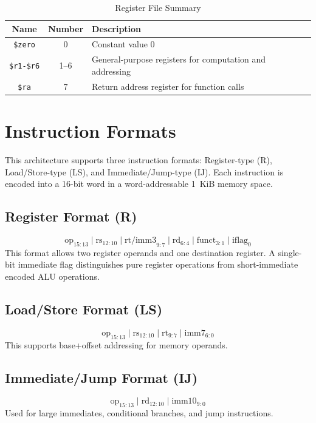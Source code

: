 \documentclass[12pt]{report}
\begin{document}
\begin{table}[h!]
\centering
\begin{tabular}{|c|c|l|}
\hline
\textbf{Name} & \textbf{Number} & \textbf{Description} \\ \hline
\texttt{\$zero} & 0 & Constant value 0 \\ \hline
\texttt{\$r1-\$r6} & 1--6 & General-purpose registers for computation and addressing \\ \hline
\texttt{\$ra} & 7 & Return address register for function calls \\ \hline
\end{tabular}
\caption{Register File Summary}
\end{table}


\chapter{Instruction Formats}

This architecture supports three instruction formats: Register-type (R), Load/Store-type (LS), and Immediate/Jump-type (IJ).  
Each instruction is encoded into a 16-bit word in a word-addressable 1~KiB memory space.

\section{Register Format (R)}
\[
\text{op}_{15:13} \;\vert\; \text{rs}_{12:10} \;\vert\; \text{rt/imm3}_{9:7} \;\vert\; 
\text{rd}_{6:4} \;\vert\; \text{funct}_{3:1} \;\vert\; \text{iflag}_{0}
\]
This format allows two register operands and one destination register.  
A single-bit immediate flag distinguishes pure register operations from short-immediate encoded ALU operations.

\section{Load/Store Format (LS)}
\[
\text{op}_{15:13} \;\vert\; \text{rs}_{12:10} \;\vert\; \text{rt}_{9:7} \;\vert\; 
\text{imm7}_{6:0}
\]
This supports base+offset addressing for memory operands.

\section{Immediate/Jump Format (IJ)}
\[
\text{op}_{15:13} \;\vert\; \text{rd}_{12:10} \;\vert\; 
\text{imm10}_{9:0}
\]
Used for large immediates, conditional branches, and jump instructions.
\end{document}
